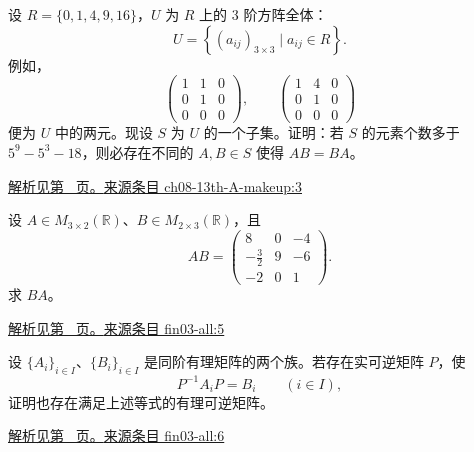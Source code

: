 \documentclass[UTF8,12pt,a4paper,fontset=fandol]{ctexart}
\begin{document}
\begin{example}\label{ex:ch08-13th-A-makeup:3}

设 $R=\{0,1,4,9,16\}$，$U$ 为 $R$ 上的 3 阶方阵全体：
\[
U=\left\{\left(a_{ij}\right)_{3\times 3}\mid a_{ij}\in R\right\}.
\]
例如，
\[
\begin{pmatrix}1&1&0\\ 0&1&0\\ 0&0&0\end{pmatrix},\qquad \begin{pmatrix}1&4&0\\ 0&1&0\\ 0&0&0\end{pmatrix}
\]
便为 $U$ 中的两元。现设 $S$ 为 $U$ 的一个子集。证明：若 $S$ 的元素个数多于 $5^{9}-5^{3}-18$，则必存在不同的 $A,B\in S$ 使得 $AB=BA$。

\par\hyperref[ans:ch08-13th-A-makeup:3]{解析见第~\pageref{ans:ch08-13th-A-makeup:3} 页。}\quad\href{https://github.com/lzxcr/cmc-mathematics/blob/64916fa1fdbc3e444a652eca204d5669058ee321/src/problems/preliminary/13-makeup/03.md}{来源条目 ch08-13th-A-makeup:3}

\end{example}

\begin{example}\label{ex:fin03-all:5}

设 $A\in M_{3\times2}(\mathbb R)$、$B\in M_{2\times3}(\mathbb R)$，且
\[
AB=\begin{pmatrix}8&0&-4\\-\frac32&9&-6\\-2&0&1\end{pmatrix}.
\]
求 $BA$。

\par\hyperref[ans:fin03-all:5]{解析见第~\pageref{ans:fin03-all:5} 页。}\quad\href{https://github.com/lzxcr/cmc-mathematics/blob/64916fa1fdbc3e444a652eca204d5669058ee321/src/problems/finals/03/05.md}{来源条目 fin03-all:5}

\end{example}

\begin{example}\label{ex:fin03-all:6}

设 $\{A_i\}_{i\in I}$、$\{B_i\}_{i\in I}$ 是同阶有理矩阵的两个族。若存在实可逆矩阵 $P$，使
\[
P^{-1}A_iP=B_i\qquad(i\in I),
\]
证明也存在满足上述等式的有理可逆矩阵。

\par\hyperref[ans:fin03-all:6]{解析见第~\pageref{ans:fin03-all:6} 页。}\quad\href{https://github.com/lzxcr/cmc-mathematics/blob/64916fa1fdbc3e444a652eca204d5669058ee321/src/problems/finals/03/06.md}{来源条目 fin03-all:6}

\end{example}
\end{document}

